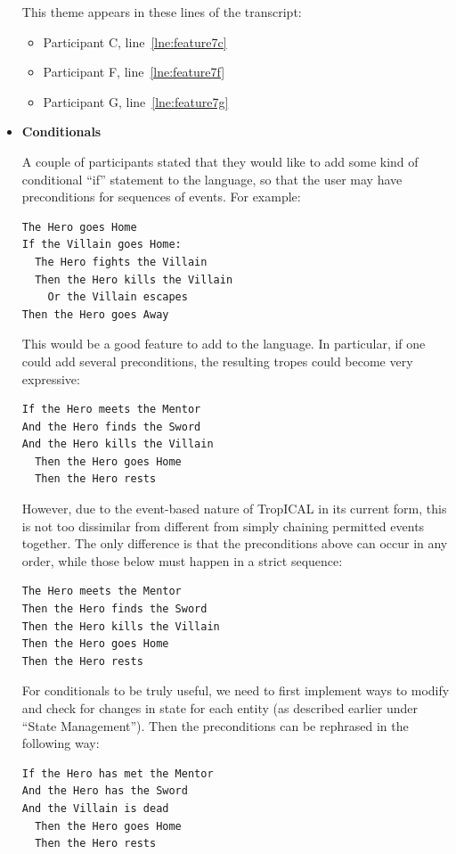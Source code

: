\documentclass[11pt]{report}
\newcommand{\lref}[1]{\hyperlink{llineno:#1}{\ref*{#1}}}
\begin{document}
\begin{itemize}
This theme appears in these lines of the transcript:

\begin{itemize}
\item Participant C, line~\lref{lne:feature7c}
\item Participant F, line~\lref{lne:feature7f}
\item Participant G, line~\lref{lne:feature7g}
\end{itemize}

\item \textbf{Conditionals}

A couple of participants stated that they would like to add some kind of
conditional ``if'' statement to the language, so that the user may have
preconditions for sequences of events. For example:

\begin{verbatim}
The Hero goes Home
If the Villain goes Home:
  The Hero fights the Villain
  Then the Hero kills the Villain
    Or the Villain escapes
Then the Hero goes Away
\end{verbatim}

This would be a good feature to add to the language. In particular, if one could
add several preconditions, the resulting tropes could become very expressive:

\begin{verbatim}
If the Hero meets the Mentor
And the Hero finds the Sword
And the Hero kills the Villain
  Then the Hero goes Home
  Then the Hero rests
\end{verbatim}

However, due to the event-based nature of TropICAL in its current form, this is
not too dissimilar from different from simply chaining permitted events
together. The only difference is that the preconditions above can occur in any
order, while those below must happen in a strict sequence:

\begin{verbatim}
The Hero meets the Mentor
Then the Hero finds the Sword
Then the Hero kills the Villain
Then the Hero goes Home
Then the Hero rests
\end{verbatim}

For conditionals to be truly useful, we need to first implement ways to modify
and check for changes in state for each entity (as described earlier under
``State Management''). Then the preconditions can be rephrased in the following way:

\begin{verbatim}
If the Hero has met the Mentor
And the Hero has the Sword
And the Villain is dead
  Then the Hero goes Home
  Then the Hero rests
\end{verbatim}


\end{itemize}
\end{document}
